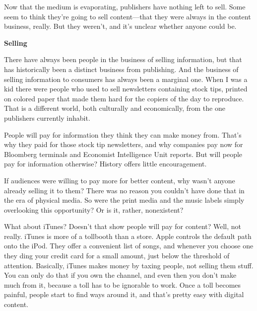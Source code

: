 Now
                  that the medium is evaporating, publishers have nothing left
                  to sell. Some seem to think they're going to sell
                  content---that they were always in the content business,
                  really. But they weren't, and it's unclear whether anyone
                  could be.

\textbf{Selling}

There have
                  always been people in the business of selling information, but
                  that has historically been a distinct business from
                  publishing. And the business of selling information to
                  consumers has always been a marginal one. When I was a kid
                  there were people who used to sell newsletters containing
                  stock tips, printed on colored paper that made them hard for
                  the copiers of the day to reproduce. That is a different
                  world, both culturally and economically, from the one
                  publishers currently inhabit.

People will pay for
                  information they think they can make money from. That's why
                  they paid for those stock tip newsletters, and why companies
                  pay now for Bloomberg terminals and Economist Intelligence
                  Unit reports. But will people pay for information otherwise?
                  History offers little encouragement.

If audiences
                  were willing to pay more for better content, why wasn't anyone
                  already selling it to them? There was no reason you couldn't
                  have done that in the era of physical media. So were the print
                  media and the music labels simply overlooking this
                  opportunity? Or is it, rather, nonexistent?

What
                  about iTunes? Doesn't that show people will pay for content?
                  Well, not really. iTunes is more of a tollbooth than a store.
                  Apple controls the default path onto the iPod. They offer a
                  convenient list of songs, and whenever you choose one they
                  ding your credit card for a small amount, just below the
                  threshold of attention. Basically, iTunes makes money by
                  taxing people, not selling them stuff. You can only do that if
                  you own the channel, and even then you don't make much from
                  it, because a toll has to be ignorable to work. Once a toll
                  becomes painful, people start to find ways around it, and
                  that's pretty easy with digital content.

